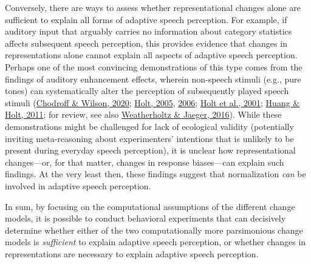 \documentclass[
  11pt,
  english,
  man,floatsintext]{apa6}
\begin{document}
Conversely, there are ways to assess whether representational changes alone are sufficient to explain all forms of adaptive speech perception. For example, if auditory input that arguably carries no information about category statistics affects subsequent speech perception, this provides evidence that changes in representations alone cannot explain all aspects of adaptive speech perception. Perhaps one of the most convincing demonstrations of this type comes from the findings of auditory enhancement effects, wherein non-speech stimuli (e.g., pure tones) can systematically alter the perception of subsequently played speech stimuli (\protect\hyperlink{ref-chodroff-wilson2020}{Chodroff \& Wilson, 2020}; \protect\hyperlink{ref-holt2005}{Holt, 2005}, \protect\hyperlink{ref-holt2006}{2006}; \protect\hyperlink{ref-holt2001}{Holt et al., 2001}; \protect\hyperlink{ref-huang-holt2011}{Huang \& Holt, 2011}; for review, see also \protect\hyperlink{ref-weatherholtz-jaeger2016}{Weatherholtz \& Jaeger, 2016}). While these demonstrations might be challenged for lack of ecological validity (potentially inviting meta-reasoning about experimenters' intentions that is unlikely to be present during everyday speech perception), it is unclear how representational changes---or, for that matter, changes in response biases---can explain such findings. At the very least then, these findings suggest that normalization \emph{can} be involved in adaptive speech perception.

In sum, by focusing on the computational assumptions of the different change models, it is possible to conduct behavioral experiments that can decisively determine whether either of the two computationally more parsimonious change models is \emph{sufficient} to explain adaptive speech perception, or whether changes in representations are necessary to explain adaptive speech perception.
\end{document}
